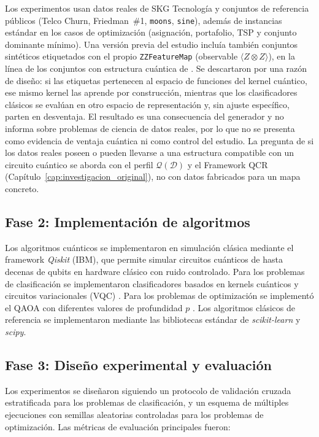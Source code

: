 Los experimentos usan datos reales de SKG Tecnología y conjuntos de referencia públicos (Telco Churn, Friedman~\#1, \texttt{moons}, \texttt{sine}), además de instancias estándar en los casos de optimización (asignación, portafolio, TSP y conjunto dominante mínimo). Una versión previa del estudio incluía también conjuntos sintéticos etiquetados con el propio \texttt{ZZFeatureMap} (observable $\langle Z\otimes Z\rangle$), en la línea de los conjuntos con estructura cuántica de \cite{havlicek2019}. Se descartaron por una razón de diseño: si las etiquetas pertenecen al espacio de funciones del kernel cuántico, ese mismo kernel las aprende por construcción, mientras que los clasificadores clásicos se evalúan en otro espacio de representación y, sin ajuste específico, parten en desventaja. El resultado es una consecuencia del generador y no informa sobre problemas de ciencia de datos reales, por lo que no se presenta como evidencia de ventaja cuántica ni como control del estudio. La pregunta de si los datos reales poseen o pueden llevarse a una estructura compatible con un circuito cuántico se aborda con el perfil $\mathcal{Q}(\mathcal{D})$ y el Framework QCR (Capítulo~\ref{cap:investigacion_original}), no con datos fabricados para un mapa concreto.

\subsection{Fase 2: Implementación de algoritmos}

Los algoritmos cuánticos se implementaron en simulación clásica mediante el framework \textit{Qiskit} (IBM), que permite simular circuitos cuánticos de hasta decenas de qubits en hardware clásico con ruido controlado. Para los problemas de clasificación se implementaron clasificadores basados en kernels cuánticos \citep{schuld2021} y circuitos variacionales (VQC) \citep{cerezo2021}. Para los problemas de optimización se implementó el QAOA con diferentes valores de profundidad $p$ \citep{farhi2014, zhou2020}. Los algoritmos clásicos de referencia se implementaron mediante las bibliotecas estándar de \textit{scikit-learn} y \textit{scipy}.

\subsection{Fase 3: Diseño experimental y evaluación}

Los experimentos se diseñaron siguiendo un protocolo de validación cruzada estratificada para los problemas de clasificación, y un esquema de múltiples ejecuciones con semillas aleatorias controladas para los problemas de optimización. Las métricas de evaluación principales fueron:

